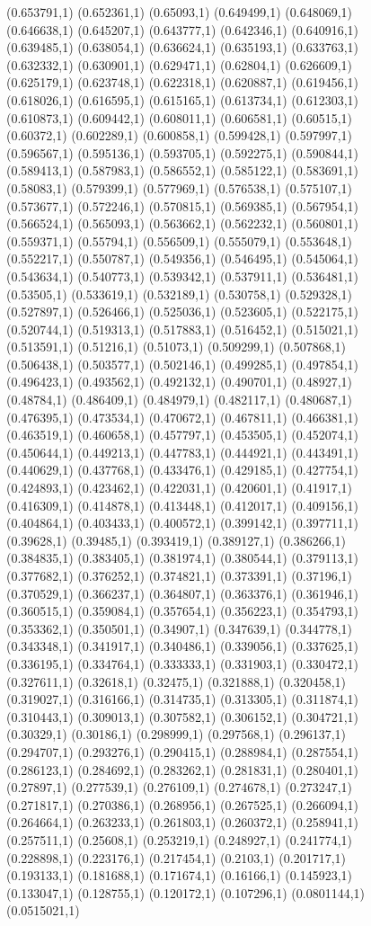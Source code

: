 \documentclass[conference]{IEEEtran}
\begin{document}
\begin{figure}[t]
(0.653791,1) (0.652361,1) (0.65093,1) (0.649499,1) (0.648069,1) (0.646638,1) (0.645207,1) (0.643777,1) (0.642346,1) (0.640916,1) (0.639485,1) (0.638054,1) (0.636624,1) (0.635193,1) (0.633763,1) (0.632332,1) (0.630901,1) (0.629471,1) (0.62804,1) (0.626609,1) (0.625179,1) (0.623748,1) (0.622318,1) (0.620887,1) (0.619456,1) (0.618026,1) (0.616595,1) (0.615165,1) (0.613734,1) (0.612303,1) (0.610873,1) (0.609442,1) (0.608011,1) (0.606581,1) (0.60515,1) (0.60372,1) (0.602289,1) (0.600858,1) (0.599428,1) (0.597997,1) (0.596567,1) (0.595136,1) (0.593705,1) (0.592275,1) (0.590844,1) (0.589413,1) (0.587983,1) (0.586552,1) (0.585122,1) (0.583691,1) (0.58083,1) (0.579399,1) (0.577969,1) (0.576538,1) (0.575107,1) (0.573677,1) (0.572246,1) (0.570815,1) (0.569385,1) (0.567954,1) (0.566524,1) (0.565093,1) (0.563662,1) (0.562232,1) (0.560801,1) (0.559371,1) (0.55794,1) (0.556509,1) (0.555079,1) (0.553648,1) (0.552217,1) (0.550787,1) (0.549356,1) (0.546495,1) (0.545064,1) (0.543634,1) (0.540773,1) (0.539342,1) (0.537911,1) (0.536481,1) (0.53505,1) (0.533619,1) (0.532189,1) (0.530758,1) (0.529328,1) (0.527897,1) (0.526466,1) (0.525036,1) (0.523605,1) (0.522175,1) (0.520744,1) (0.519313,1) (0.517883,1) (0.516452,1) (0.515021,1) (0.513591,1) (0.51216,1) (0.51073,1) (0.509299,1) (0.507868,1) (0.506438,1) (0.503577,1) (0.502146,1) (0.499285,1) (0.497854,1) (0.496423,1) (0.493562,1) (0.492132,1) (0.490701,1) (0.48927,1) (0.48784,1) (0.486409,1) (0.484979,1) (0.482117,1) (0.480687,1) (0.476395,1) (0.473534,1) (0.470672,1) (0.467811,1) (0.466381,1) (0.463519,1) (0.460658,1) (0.457797,1) (0.453505,1) (0.452074,1) (0.450644,1) (0.449213,1) (0.447783,1) (0.444921,1) (0.443491,1) (0.440629,1) (0.437768,1) (0.433476,1) (0.429185,1) (0.427754,1) (0.424893,1) (0.423462,1) (0.422031,1) (0.420601,1) (0.41917,1) (0.416309,1) (0.414878,1) (0.413448,1) (0.412017,1) (0.409156,1) (0.404864,1) (0.403433,1) (0.400572,1) (0.399142,1) (0.397711,1) (0.39628,1) (0.39485,1) (0.393419,1) (0.389127,1) (0.386266,1) (0.384835,1) (0.383405,1) (0.381974,1) (0.380544,1) (0.379113,1) (0.377682,1) (0.376252,1) (0.374821,1) (0.373391,1) (0.37196,1) (0.370529,1) (0.366237,1) (0.364807,1) (0.363376,1) (0.361946,1) (0.360515,1) (0.359084,1) (0.357654,1) (0.356223,1) (0.354793,1) (0.353362,1) (0.350501,1) (0.34907,1) (0.347639,1) (0.344778,1) (0.343348,1) (0.341917,1) (0.340486,1) (0.339056,1) (0.337625,1) (0.336195,1) (0.334764,1) (0.333333,1) (0.331903,1) (0.330472,1) (0.327611,1) (0.32618,1) (0.32475,1) (0.321888,1) (0.320458,1) (0.319027,1) (0.316166,1) (0.314735,1) (0.313305,1) (0.311874,1) (0.310443,1) (0.309013,1) (0.307582,1) (0.306152,1) (0.304721,1) (0.30329,1) (0.30186,1) (0.298999,1) (0.297568,1) (0.296137,1) (0.294707,1) (0.293276,1) (0.290415,1) (0.288984,1) (0.287554,1) (0.286123,1) (0.284692,1) (0.283262,1) (0.281831,1) (0.280401,1) (0.27897,1) (0.277539,1) (0.276109,1) (0.274678,1) (0.273247,1) (0.271817,1) (0.270386,1) (0.268956,1) (0.267525,1) (0.266094,1) (0.264664,1) (0.263233,1) (0.261803,1) (0.260372,1) (0.258941,1) (0.257511,1) (0.25608,1) (0.253219,1) (0.248927,1) (0.241774,1) (0.228898,1) (0.223176,1) (0.217454,1) (0.2103,1) (0.201717,1) (0.193133,1) (0.181688,1) (0.171674,1) (0.16166,1) (0.145923,1) (0.133047,1) (0.128755,1) (0.120172,1) (0.107296,1) (0.0801144,1) (0.0515021,1) 
\end{figure}
\end{document}
